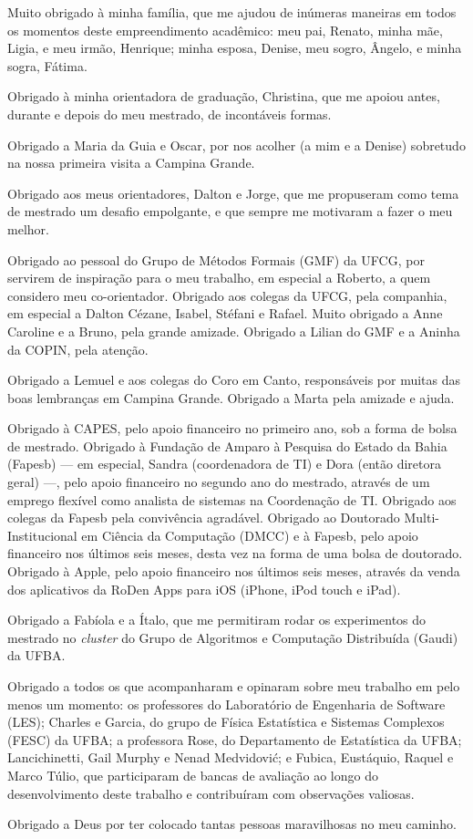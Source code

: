 Muito obrigado à minha família, que me ajudou de inúmeras maneiras em todos os momentos deste empreendimento acadêmico: meu pai, Renato, minha mãe, Ligia, e meu irmão, Henrique; minha esposa, Denise, meu sogro, Ângelo, e minha sogra, Fátima.

Obrigado à minha orientadora de graduação, Christina, que me apoiou antes, durante e depois do meu mestrado, de incontáveis formas.

Obrigado a Maria da Guia e Oscar, por nos acolher (a mim e a Denise) sobretudo na nossa primeira visita a Campina Grande.

Obrigado aos meus orientadores, Dalton e Jorge, que me propuseram como tema de mestrado um desafio empolgante, e que sempre me motivaram a fazer o meu melhor.

Obrigado ao pessoal do Grupo de Métodos Formais (GMF) da UFCG, por servirem de inspiração para o meu trabalho, em especial a Roberto, a quem considero meu co-orientador. Obrigado aos colegas da UFCG, pela companhia, em especial a Dalton Cézane, Isabel, Stéfani e Rafael. Muito obrigado a Anne Caroline e a Bruno, pela grande amizade. Obrigado a Lilian do GMF e a Aninha da COPIN, pela atenção.

Obrigado a Lemuel e aos colegas do Coro em Canto, responsáveis por muitas das boas lembranças em Campina Grande. Obrigado a Marta pela amizade e ajuda.

Obrigado à CAPES, pelo apoio financeiro no primeiro ano, sob a forma de bolsa de mestrado. Obrigado à Fundação de Amparo à Pesquisa do Estado da Bahia (Fapesb) --- em especial, Sandra (coordenadora de TI) e Dora (então diretora geral) ---, pelo apoio financeiro no segundo ano do mestrado, através de um emprego flexível como analista de sistemas na Coordenação de TI. Obrigado aos colegas da Fapesb pela convivência agradável. Obrigado ao Doutorado Multi-Institucional em Ciência da Computação (DMCC) e à Fapesb, pelo apoio financeiro nos últimos seis meses, desta vez na forma de uma bolsa de doutorado. Obrigado à Apple, pelo apoio financeiro nos últimos seis meses, através da venda dos aplicativos da RoDen Apps para iOS (iPhone, iPod touch e iPad).

Obrigado a Fabíola e a Ítalo, que me permitiram rodar os experimentos do mestrado no \emph{cluster} do Grupo de Algoritmos e Computação Distribuída (Gaudi) da UFBA.

Obrigado a todos os que acompanharam e opinaram sobre meu trabalho em pelo menos um momento: os professores do Laboratório de Engenharia de Software (LES); Charles e Garcia, do grupo de Física Estatística e Sistemas Complexos (FESC) da UFBA; a professora Rose, do Departamento de Estatística da UFBA; Lancichinetti, Gail Murphy e Nenad Medvidović; e Fubica, Eustáquio, Raquel e Marco Túlio, que participaram de bancas de avaliação ao longo do desenvolvimento deste trabalho e contribuíram com observações valiosas.

Obrigado a Deus por ter colocado tantas pessoas maravilhosas no meu caminho.